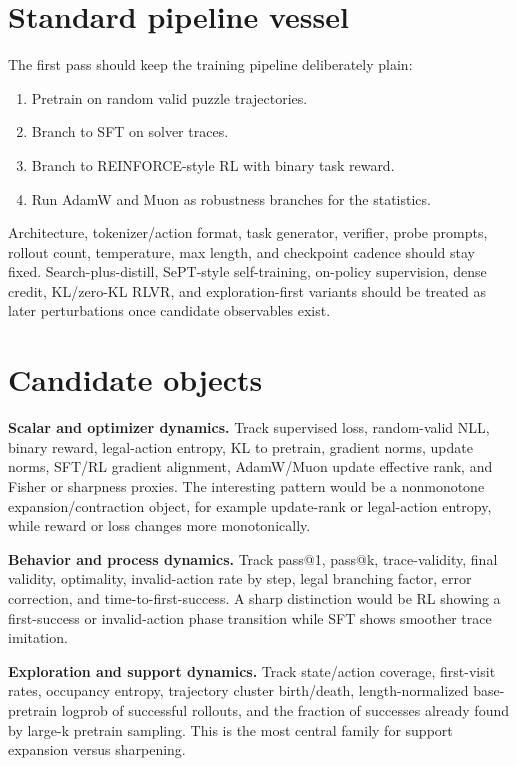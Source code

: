\documentclass[11pt]{article}
\begin{document}
\section*{Standard pipeline vessel}

The first pass should keep the training pipeline deliberately plain:

\begin{enumerate}
\item Pretrain on random valid puzzle trajectories.
\item Branch to SFT on solver traces.
\item Branch to REINFORCE-style RL with binary task reward.
\item Run AdamW and Muon as robustness branches for the statistics.
\end{enumerate}

Architecture, tokenizer/action format, task generator, verifier, probe prompts,
rollout count, temperature, max length, and checkpoint cadence should stay
fixed. Search-plus-distill, SePT-style self-training, on-policy supervision,
dense credit, KL/zero-KL RLVR, and exploration-first variants should be treated
as later perturbations once candidate observables exist.

\section*{Candidate objects}

\textbf{Scalar and optimizer dynamics.}
Track supervised loss, random-valid NLL, binary reward, legal-action entropy, KL
to pretrain, gradient norms, update norms, SFT/RL gradient alignment, AdamW/Muon
update effective rank, and Fisher or sharpness proxies. The interesting pattern
would be a nonmonotone expansion/contraction object, for example update-rank or
legal-action entropy, while reward or loss changes more monotonically.

\textbf{Behavior and process dynamics.}
Track pass@1, pass@k, trace-validity, final validity, optimality, invalid-action
rate by step, legal branching factor, error correction, and time-to-first-success.
A sharp distinction would be RL showing a first-success or invalid-action phase
transition while SFT shows smoother trace imitation.

\textbf{Exploration and support dynamics.}
Track state/action coverage, first-visit rates, occupancy entropy, trajectory
cluster birth/death, length-normalized base-pretrain logprob of successful
rollouts, and the fraction of successes already found by large-k pretrain
sampling. This is the most central family for support expansion versus
sharpening.
\end{document}
